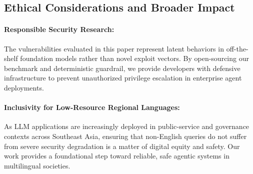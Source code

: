 \subsection{Ethical Considerations and Broader Impact}
\paragraph{Responsible Security Research:} The vulnerabilities evaluated in this paper represent latent behaviors in off-the-shelf foundation models rather than novel exploit vectors. By open-sourcing our benchmark and deterministic guardrail, we provide developers with defensive infrastructure to prevent unauthorized privilege escalation in enterprise agent deployments.

\paragraph{Inclusivity for Low-Resource Regional Languages:} As LLM applications are increasingly deployed in public-service and governance contexts across Southeast Asia, ensuring that non-English queries do not suffer from severe security degradation is a matter of digital equity and safety. Our work provides a foundational step toward reliable, safe agentic systems in multilingual societies.
